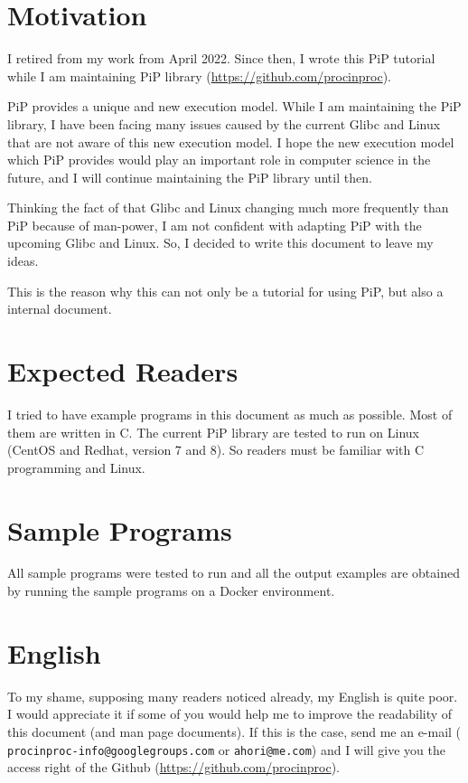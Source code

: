 
\section*{Motivation}

I retired from my work from April 2022. Since then, I wrote this PiP
tutorial while I am maintaining PiP library
(\url{https://github.com/procinproc}).

PiP provides a unique and new execution model. While I am maintaining
the PiP library, I have been facing many issues caused by the current
Glibc and Linux that are not aware of this new execution model. 
I hope the new execution model which PiP provides would play an
important role in computer science in the future, and I will continue
maintaining the PiP library until then.

Thinking the fact of that Glibc and Linux changing much more
frequently than PiP because of man-power, I am not confident with
adapting PiP with the upcoming Glibc and Linux. So, I decided to write
this document to leave my ideas.

This is the reason why this can not only be a tutorial for
using PiP, but also a internal document. 

\section*{Expected Readers}

I tried to have example programs in this document as much as
possible. Most of them are written in C. The current PiP library are
tested to run on Linux (CentOS and Redhat, version 7 and 8). So
readers must be familiar with C programming and Linux. 

\section*{Sample Programs}

All sample programs were tested to run and all the output examples are
obtained by running the sample programs on a Docker environment.

\section*{English}

To my shame, supposing many readers noticed already, my English is
quite poor. I would appreciate it if some of you would help me to
improve the readability of this document (and man page documents). If
this is the case, send me an e-mail ({\tt
  procinproc-info@googlegroups.com} or {\tt ahori@me.com}) and I will
give you the access right of the Github
(\url{https://github.com/procinproc}). 

